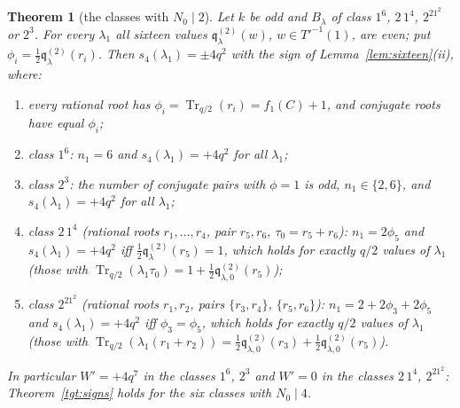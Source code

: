 \documentclass[12pt,a4paper]{amsart}
\newtheorem{theorem}{Theorem}[section]
\theoremstyle{definition}
\newcommand{\Tr}{\operatorname{Tr}}
\newcommand{\qq}{\mathfrak{q}}
\begin{document}
\begin{theorem}[the classes with $N_0\mid2$]\label{thm:N0div2}
Let $k$ be odd and $B_\lambda$ of class $1^6$, $2\,1^4$, $2^21^2$ or $2^3$. For every $\lambda_1$ all sixteen values $\qq^{(2)}_\lambda(w)$, $w\in T'^{-1}(1)$, are even; put $\phi_i=\frac12\qq^{(2)}_\lambda(r_i)$. Then $s_4(\lambda_1)=\pm4q^2$ with the sign of Lemma~\ref{lem:sixteen}\textup{(ii)}, where:
\begin{enumerate}[label=\textup{(\roman*)},leftmargin=2em]
\item every rational root has $\phi_i=\Tr_{q/2}(r_i)=f_1(C)+1$, and conjugate roots have equal $\phi_i$;
\item class $1^6$: $n_1=6$ and $s_4(\lambda_1)=+4q^2$ for all $\lambda_1$;
\item class $2^3$: the number of conjugate pairs with $\phi=1$ is odd, $n_1\in\{2,6\}$, and $s_4(\lambda_1)=+4q^2$ for all $\lambda_1$;
\item class $2\,1^4$ (rational roots $r_1,\dots,r_4$, pair $r_5,r_6$, $\tau_0=r_5+r_6$): $n_1=2\phi_5$ and $s_4(\lambda_1)=+4q^2$ iff $\frac12\qq^{(2)}_\lambda(r_5)=1$, which holds for exactly $q/2$ values of $\lambda_1$ (those with $\Tr_{q/2}(\lambda_1\tau_0)=1+\frac12\qq^{(2)}_{\lambda,0}(r_5)$);
\item class $2^21^2$ (rational roots $r_1,r_2$, pairs $\{r_3,r_4\}$, $\{r_5,r_6\}$): $n_1=2+2\phi_3+2\phi_5$ and $s_4(\lambda_1)=+4q^2$ iff $\phi_3=\phi_5$, which holds for exactly $q/2$ values of $\lambda_1$ (those with $\Tr_{q/2}(\lambda_1(r_1+r_2))=\frac12\qq^{(2)}_{\lambda,0}(r_3)+\frac12\qq^{(2)}_{\lambda,0}(r_5)$).
\end{enumerate}
In particular $W'=+4q^7$ in the classes $1^6$, $2^3$ and $W'=0$ in the classes $2\,1^4$, $2^21^2$: Theorem~\ref{tgt:signs} holds for the six classes with $N_0\mid4$.
\end{theorem}
\end{document}
